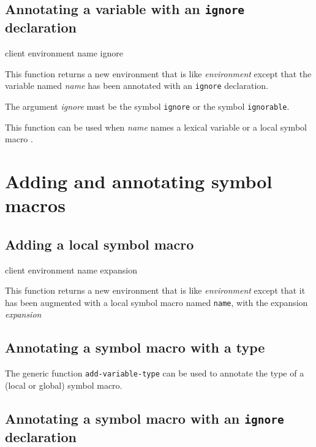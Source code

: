 \subsection{Annotating a variable with an \texttt{ignore} declaration}
\label{sec-annotating-a-variable-with-ignore}

{\footnotesize
{} {client environment name ignore}
}

This function returns a new environment that is like
\textit{environment} except that the variable named \textit{name} has
been annotated with an \texttt{ignore} declaration.

The argument \textit{ignore} must be the symbol \texttt{ignore} or the
symbol \texttt{ignorable}.

This function can be used when \textit{name} names a lexical variable
or a local symbol macro
.

\section{Adding and annotating symbol macros}

\subsection{Adding a local symbol macro}

{\footnotesize
{} {client environment name expansion}
}

This function returns a new environment that is like
\textit{environment} except that it has been augmented with a local
symbol macro named \texttt{name}, with the expansion
\textit{expansion}

\subsection{Annotating a symbol macro with a type}
\label{sec-annotating-a-symbol-macro-with-a-type}

The generic function \texttt{add-variable-type}
 can be used to annotate
the type of a (local or global) symbol macro.

\subsection{Annotating a symbol macro with an \texttt{ignore} declaration}
\label{sec-annotating-a-local-symbol-macro-with-ignore}

